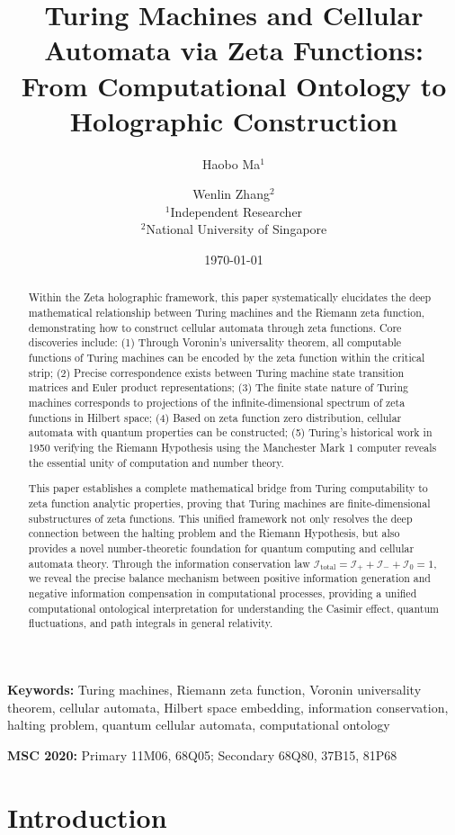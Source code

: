\documentclass[12pt]{article}
\title{Turing Machines and Cellular Automata via Zeta Functions: \\ From Computational Ontology to Holographic Construction}
\author{Haobo Ma$^1$ \and Wenlin Zhang$^2$\\
\small $^1$Independent Researcher\\
\small $^2$National University of Singapore}
\date{\today}
\theoremstyle{plain}
\theoremstyle{definition}
\newcommand{\cI}{\mathcal{I}}
\begin{document}
\maketitle

\begin{abstract}
Within the Zeta holographic framework, this paper systematically elucidates the deep mathematical relationship between Turing machines and the Riemann zeta function, demonstrating how to construct cellular automata through zeta functions. Core discoveries include: (1) Through Voronin's universality theorem, all computable functions of Turing machines can be encoded by the zeta function within the critical strip; (2) Precise correspondence exists between Turing machine state transition matrices and Euler product representations; (3) The finite state nature of Turing machines corresponds to projections of the infinite-dimensional spectrum of zeta functions in Hilbert space; (4) Based on zeta function zero distribution, cellular automata with quantum properties can be constructed; (5) Turing's historical work in 1950 verifying the Riemann Hypothesis using the Manchester Mark 1 computer reveals the essential unity of computation and number theory.

This paper establishes a complete mathematical bridge from Turing computability to zeta function analytic properties, proving that Turing machines are finite-dimensional substructures of zeta functions. This unified framework not only resolves the deep connection between the halting problem and the Riemann Hypothesis, but also provides a novel number-theoretic foundation for quantum computing and cellular automata theory. Through the information conservation law $\cI_{\text{total}} = \cI_+ + \cI_- + \cI_0 = 1$, we reveal the precise balance mechanism between positive information generation and negative information compensation in computational processes, providing a unified computational ontological interpretation for understanding the Casimir effect, quantum fluctuations, and path integrals in general relativity.
\end{abstract}

\noindent\textbf{Keywords:} Turing machines, Riemann zeta function, Voronin universality theorem, cellular automata, Hilbert space embedding, information conservation, halting problem, quantum cellular automata, computational ontology

\noindent\textbf{MSC 2020:} Primary 11M06, 68Q05; Secondary 68Q80, 37B15, 81P68

\section{Introduction}
\end{document}
